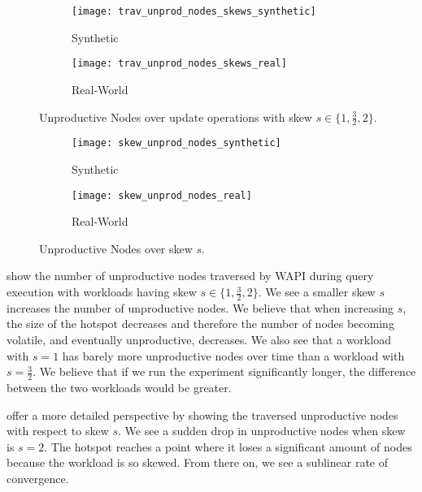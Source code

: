 \documentclass[abstracton,12pt]{scrartcl}
\theoremstyle{definition}
\begin{document}
\begin{figure}[h]
  \centering
  \begin{subfigure}{0.49\linewidth}
    \centering
    \caption{Synthetic}
    \texttt{[image: trav\_unprod\_nodes\_skews\_synthetic]}
    \label{fig:trav_unprod_nodes_skews_synthetic}
  \end{subfigure}
  \begin{subfigure}{0.49\linewidth}
    \centering
    \caption{Real-World}
    \texttt{[image: trav\_unprod\_nodes\_skews\_real]}
    \label{fig:trav_unprod_nodes_skews_real}
  \end{subfigure}
  \vspace{-0.5cm}
  \caption{Unproductive Nodes over update operations with skew $s \in \{
  1, \frac{3}{2}, 2\}$.}
\end{figure}

\begin{figure}[h]
  \centering
  \begin{subfigure}{0.49\linewidth}
    \centering
    \caption{Synthetic}
    \texttt{[image: skew\_unprod\_nodes\_synthetic]}
    \label{fig:skew_unprod_nodes_synthetic}
  \end{subfigure}
  \begin{subfigure}{0.49\linewidth}
    \centering
    \caption{Real-World}
    \texttt{[image: skew\_unprod\_nodes\_real]}
    \label{fig:skew_unprod_nodes_real}
  \end{subfigure}
  \vspace{-0.5cm}
  \caption{Unproductive Nodes over skew $s$.}
\end{figure}

 show the number
of unproductive nodes traversed by WAPI during query execution with workloads having skew
$s \in \{1,\frac{3}{2},2\}$.  We see a smaller
skew $s$ increases the number of unproductive nodes. We believe that when increasing $s$, 
the size of the hotspot decreases and therefore the number of nodes
becoming volatile, and eventually unproductive, decreases.
We also see that a workload with $s = 1$ has barely more unproductive nodes over time
than a workload with $s = \frac{3}{2}$. We believe that if we run the experiment
significantly longer, the difference between the two workloads would be greater.

 offer a more detailed
perspective by showing the traversed unproductive nodes with respect to skew $s$. We see a
sudden drop in unproductive nodes when skew is $s = 2$. 
The hotspot reaches a point where it loses a significant amount of nodes because the 
workload is so skewed. From there on, we see a sublinear rate of convergence. 
\end{document}
